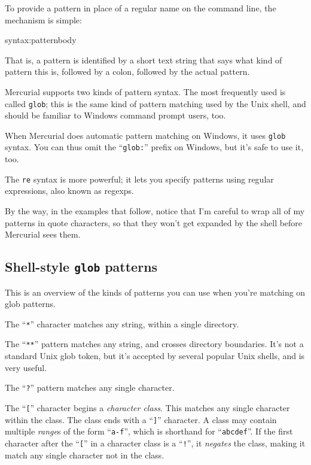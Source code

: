 To provide a pattern in place of a regular name on the command line,
the mechanism is simple:
\begin{codesample2}
  syntax:patternbody
\end{codesample2}
That is, a pattern is identified by a short text string that says what
kind of pattern this is, followed by a colon, followed by the actual
pattern.

Mercurial supports two kinds of pattern syntax.  The most frequently
used is called \texttt{glob}; this is the same kind of pattern
matching used by the Unix shell, and should be familiar to Windows
command prompt users, too.  

When Mercurial does automatic pattern matching on Windows, it uses
\texttt{glob} syntax.  You can thus omit the ``\texttt{glob:}'' prefix
on Windows, but it's safe to use it, too.

The \texttt{re} syntax is more powerful; it lets you specify patterns
using regular expressions, also known as regexps.

By the way, in the examples that follow, notice that I'm careful to
wrap all of my patterns in quote characters, so that they won't get
expanded by the shell before Mercurial sees them.

\subsection{Shell-style \texttt{glob} patterns}

This is an overview of the kinds of patterns you can use when you're
matching on glob patterns.

The ``\texttt{*}'' character matches any string, within a single
directory.

The ``\texttt{**}'' pattern matches any string, and crosses directory
boundaries.  It's not a standard Unix glob token, but it's accepted by
several popular Unix shells, and is very useful.

The ``\texttt{?}'' pattern matches any single character.

The ``\texttt{[}'' character begins a \emph{character class}.  This
matches any single character within the class.  The class ends with a
``\texttt{]}'' character.  A class may contain multiple \emph{range}s
of the form ``\texttt{a-f}'', which is shorthand for
``\texttt{abcdef}''.
If the first character after the ``\texttt{[}'' in a character class
is a ``\texttt{!}'', it \emph{negates} the class, making it match any
single character not in the class.

